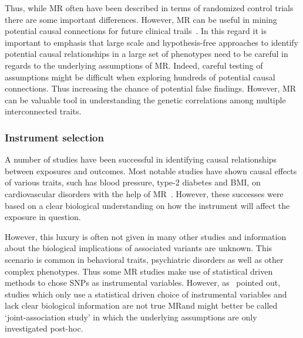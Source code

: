 Thus, while MR often have been described in terms of randomized control trials there are some important differences.
However, MR can be useful in mining potential causal connections for future clinical trails~\cite{Evans2015}. 
In this regard it is important to emphasis that large scale and hypothesis-free approaches to identify potential causal relationships in a large set of phenotypes need to be careful in regards to the underlying assumptions of MR\@.
Indeed, careful testing of assumptions might be difficult when exploring hundreds of potential causal connections.
Thus increasing the chance of potential false findings.
However, MR can be valuable tool in understanding the genetic correlations among multiple interconnected traits. 

\subsubsection{Instrument selection}
\label{ssub:instrument_selection}

A number of studies have been successful in identifying causal relationships between exposures and outcomes.
Most notable studies have shown causal effects of various traits, such has blood pressure, type-2 diabetes and BMI, on cardiovascular disorders with the help of MR~\cite{Swerdlow,Ference2015,Lieb2013,Voight2012a}.
However, these successes were based on a clear biological understanding on how the instrument will affect the exposure in question.

However, this luxury is often not given in many other studies and information about the biological implications of associated variants are unknown.
This scenario is common in behavioral traits, psychiatric disorders as well as other complex phenotypes.
Thus some MR studies make use of statistical driven methods to chose SNPs as instrumental variables.
However, as~\citet{Burgess2016a} pointed out, studies which only use a statistical driven choice of instrumental variables and lack clear biological information are not true MR\@ and might better be called `joint-association study' in which the underlying assumptions are only investigated post-hoc.

